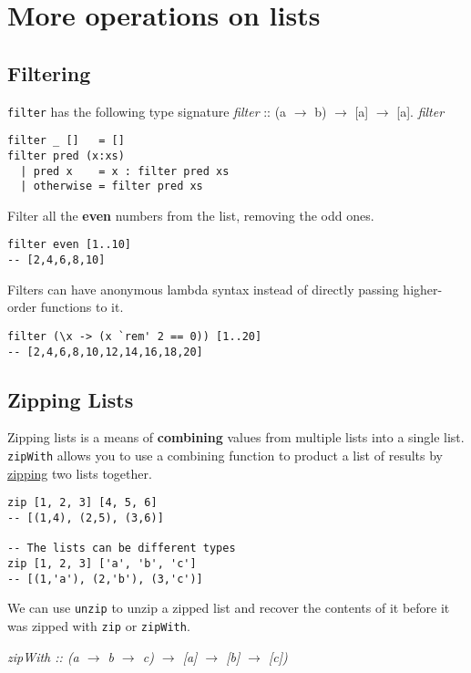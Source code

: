 \section{More operations on lists}

\subsection{Filtering}
\texttt{filter} has the following type signature \emph{filter} :: (a $\rightarrow$ b) $\rightarrow$ [a] $\rightarrow$ [a]. \emph{filter} 

\begin{lstlisting}
filter _ []   = []
filter pred (x:xs)
  | pred x    = x : filter pred xs
  | otherwise = filter pred xs
\end{lstlisting}

Filter all the \textbf{even} numbers from the list, removing the odd ones.
\begin{lstlisting}
filter even [1..10]
-- [2,4,6,8,10]
\end{lstlisting}

Filters can have anonymous lambda syntax instead of directly passing higher-order functions to it.
\begin{lstlisting}
filter (\x -> (x `rem' 2 == 0)) [1..20]
-- [2,4,6,8,10,12,14,16,18,20]
\end{lstlisting}

\subsection{Zipping Lists}
Zipping lists is a means of \textbf{combining} values from multiple lists into a single list. \texttt{zipWith} allows you to use a combining function to product a list of results by \underline{zipping} two lists together.

\begin{lstlisting}
zip [1, 2, 3] [4, 5, 6]
-- [(1,4), (2,5), (3,6)]

-- The lists can be different types
zip [1, 2, 3] ['a', 'b', 'c']
-- [(1,'a'), (2,'b'), (3,'c')]
\end{lstlisting}

We can use \texttt{unzip} to unzip a zipped list and recover the contents of it before it was zipped with \texttt{zip} or \texttt{zipWith}.

\emph{zipWith :: (a $\rightarrow$ b $\rightarrow$ c) $\rightarrow$ [a] $\rightarrow$ [b] $\rightarrow$ [c])}
